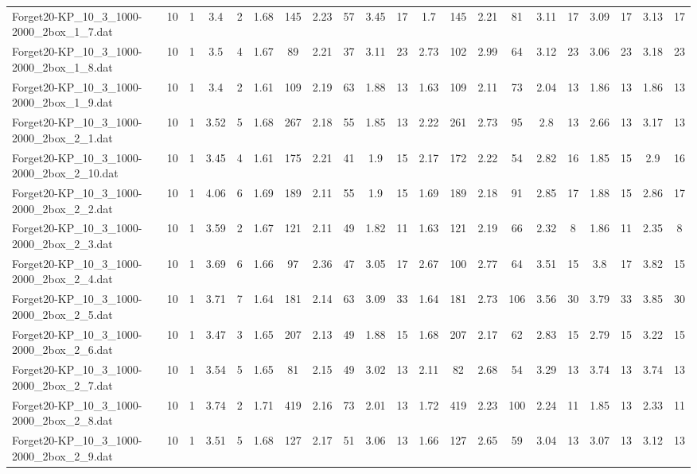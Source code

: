 \begin{sidewaystable}[!ht]
{\begin{tabular}{lcccccccccccccccccccc}
Forget20-KP\_10\_3\_1000-2000\_2box\_1\_7.dat & 10 & 1 & 3.4 & 2 & 1.68 & 145 & 2.23 & 57 & 3.45 & 17 & 1.7 & 145 & 2.21 & 81 & 3.11 & 17 & 3.09 & 17 & 3.13 & 17 \\
Forget20-KP\_10\_3\_1000-2000\_2box\_1\_8.dat & 10 & 1 & 3.5 & 4 & 1.67 & 89 & 2.21 & 37 & 3.11 & 23 & 2.73 & 102 & 2.99 & 64 & 3.12 & 23 & 3.06 & 23 & 3.18 & 23 \\
Forget20-KP\_10\_3\_1000-2000\_2box\_1\_9.dat & 10 & 1 & 3.4 & 2 & 1.61 & 109 & 2.19 & 63 & 1.88 & 13 & 1.63 & 109 & 2.11 & 73 & 2.04 & 13 & 1.86 & 13 & 1.86 & 13 \\
Forget20-KP\_10\_3\_1000-2000\_2box\_2\_1.dat & 10 & 1 & 3.52 & 5 & 1.68 & 267 & 2.18 & 55 & 1.85 & 13 & 2.22 & 261 & 2.73 & 95 & 2.8 & 13 & 2.66 & 13 & 3.17 & 13 \\
Forget20-KP\_10\_3\_1000-2000\_2box\_2\_10.dat & 10 & 1 & 3.45 & 4 & 1.61 & 175 & 2.21 & 41 & 1.9 & 15 & 2.17 & 172 & 2.22 & 54 & 2.82 & 16 & 1.85 & 15 & 2.9 & 16 \\
Forget20-KP\_10\_3\_1000-2000\_2box\_2\_2.dat & 10 & 1 & 4.06 & 6 & 1.69 & 189 & 2.11 & 55 & 1.9 & 15 & 1.69 & 189 & 2.18 & 91 & 2.85 & 17 & 1.88 & 15 & 2.86 & 17 \\
Forget20-KP\_10\_3\_1000-2000\_2box\_2\_3.dat & 10 & 1 & 3.59 & 2 & 1.67 & 121 & 2.11 & 49 & 1.82 & 11 & 1.63 & 121 & 2.19 & 66 & 2.32 & 8 & 1.86 & 11 & 2.35 & 8 \\
Forget20-KP\_10\_3\_1000-2000\_2box\_2\_4.dat & 10 & 1 & 3.69 & 6 & 1.66 & 97 & 2.36 & 47 & 3.05 & 17 & 2.67 & 100 & 2.77 & 64 & 3.51 & 15 & 3.8 & 17 & 3.82 & 15 \\
Forget20-KP\_10\_3\_1000-2000\_2box\_2\_5.dat & 10 & 1 & 3.71 & 7 & 1.64 & 181 & 2.14 & 63 & 3.09 & 33 & 1.64 & 181 & 2.73 & 106 & 3.56 & 30 & 3.79 & 33 & 3.85 & 30 \\
Forget20-KP\_10\_3\_1000-2000\_2box\_2\_6.dat & 10 & 1 & 3.47 & 3 & 1.65 & 207 & 2.13 & 49 & 1.88 & 15 & 1.68 & 207 & 2.17 & 62 & 2.83 & 15 & 2.79 & 15 & 3.22 & 15 \\
Forget20-KP\_10\_3\_1000-2000\_2box\_2\_7.dat & 10 & 1 & 3.54 & 5 & 1.65 & 81 & 2.15 & 49 & 3.02 & 13 & 2.11 & 82 & 2.68 & 54 & 3.29 & 13 & 3.74 & 13 & 3.74 & 13 \\
Forget20-KP\_10\_3\_1000-2000\_2box\_2\_8.dat & 10 & 1 & 3.74 & 2 & 1.71 & 419 & 2.16 & 73 & 2.01 & 13 & 1.72 & 419 & 2.23 & 100 & 2.24 & 11 & 1.85 & 13 & 2.33 & 11 \\
Forget20-KP\_10\_3\_1000-2000\_2box\_2\_9.dat & 10 & 1 & 3.51 & 5 & 1.68 & 127 & 2.17 & 51 & 3.06 & 13 & 1.66 & 127 & 2.65 & 59 & 3.04 & 13 & 3.07 & 13 & 3.12 & 13 \\

\end{tabular}}
\end{sidewaystable}
